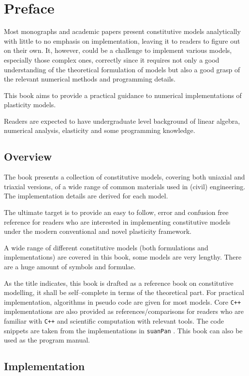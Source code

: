 \chapter{Preface}
Most monographs and academic papers present constitutive models analytically with little to no emphasis on implementation, leaving it to readers to figure out on their own.
It, however, could be a challenge to implement various models, especially those complex ones, correctly since it requires not only a good understanding of the theoretical formulation of models but also a good grasp of the relevant numerical methods and programming details.

This book aims to provide a practical guidance to numerical implementations of plasticity models.

Readers are expected to have undergraduate level background of linear algebra, numerical analysis, elasticity and some programming knowledge.
\section{Overview}
The book presents a collection of constitutive models, covering both uniaxial and triaxial versions, of a wide range of common materials used in (civil) engineering.
The implementation details are derived for each model.

The ultimate target is to provide an easy to follow, error and confusion free reference for readers who are interested in implementing constitutive models under the modern conventional and novel plasticity framework.

A wide range of different constitutive models (both formulations and implementations) are covered in this book, some models are very lengthy.
There are a huge amount of symbols and formulae.

As the title indicates, this book is drafted as a reference book on constitutive modelling, it shall be self--complete in terms of the theoretical part.
For practical implementation, algorithms in pseudo code are given for most models.
Core \texttt{C++} implementations are also provided as references/comparisons for readers who are familiar with \texttt{C++} and scientific computation with relevant tools.
The code snippets are taken from the implementations in \texttt{suanPan} \cite{Chang2022}.
This book can also be used as the program manual.
\section{Implementation}
